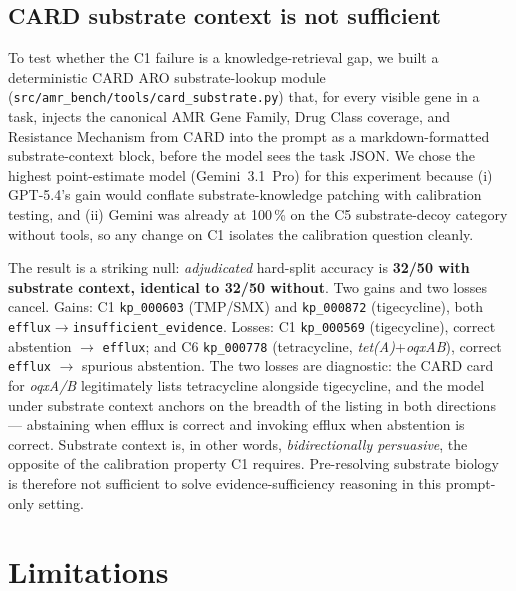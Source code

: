 \documentclass{article}
\begin{document}
\subsection{CARD substrate context is not sufficient}
\label{sec:tool}

To test whether the C1 failure is a knowledge-retrieval gap, we built a
deterministic CARD ARO substrate-lookup module
(\texttt{src/amr\_bench/tools/card\_substrate.py}) that, for every visible
gene in a task, injects the canonical AMR Gene Family, Drug Class coverage,
and Resistance Mechanism from CARD into the prompt as a markdown-formatted
substrate-context block, before the model sees the task JSON. We chose the
highest point-estimate model (Gemini~3.1~Pro) for this experiment because (i) GPT-5.4's
gain would conflate substrate-knowledge patching with calibration testing,
and (ii) Gemini was already at 100\,\% on the C5 substrate-decoy category
without tools, so any change on C1 isolates the calibration question
cleanly.

The result is a striking null: \emph{adjudicated} hard-split accuracy is
\textbf{32/50 with substrate context, identical to 32/50 without}. Two
gains and two losses cancel. Gains: C1 \texttt{kp\_000603} (TMP/SMX) and
\texttt{kp\_000872} (tigecycline), both
\texttt{efflux}$\rightarrow$\texttt{insufficient\_evidence}. Losses:
C1 \texttt{kp\_000569} (tigecycline), correct abstention $\rightarrow$
\texttt{efflux}; and C6 \texttt{kp\_000778} (tetracycline,
\emph{tet(A)}+\emph{oqxAB}), correct \texttt{efflux} $\rightarrow$
spurious abstention. The two losses are diagnostic: the CARD card for
\emph{oqxA/B} legitimately lists tetracycline alongside tigecycline, and
the model under substrate context anchors on the breadth of the listing
in both directions --- abstaining when efflux is correct and invoking
efflux when abstention is correct. Substrate context is, in other words,
\emph{bidirectionally persuasive}, the opposite of the calibration
property C1 requires. Pre-resolving substrate biology is therefore not
sufficient to solve evidence-sufficiency reasoning in this prompt-only
setting.

\section{Limitations}
\end{document}
